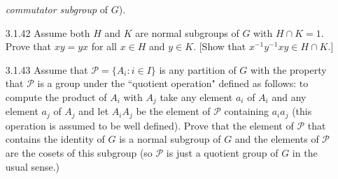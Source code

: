 \begin{enumerate}
                  \textit{commutator subgroup} of $G$).
   \item[3.1.42]  Assume both $H$ and $K$ are normal subgroups of $G$ with
                  $H \cap K = 1$. Prove that $xy = yx$ for all $x \in H$ and
                  $y \in K$. [Show that $x^{-1}y^{-1}xy \in H \cap K$.]
   \item[3.1.43]  Assume that $\mathcal{P} = \{A_i : i \in I\}$ is any partition
                  of $G$ with the property that $\mathcal{P}$ is a group under
                  the ``quotient operation" defined as follows: to compute the
                  product of $A_i$ with $A_j$ take any element $a_i$ of $A_i$
                  and any element $a_j$ of $A_j$ and let $A_iA_j$ be the element
                  of $\mathcal{P}$ containing $a_ia_j$ (this operation is
                  assumed to be well defined). Prove that the element of
                  $\mathcal{P}$ that contains the identity of $G$ is a normal
                  subgroup of $G$ and the elements of $\mathcal{P}$ are the
                  cosets of this subgroup (so $\mathcal{P}$ is just a quotient
                  group of $G$ in the usual sense.)
\end{enumerate}
